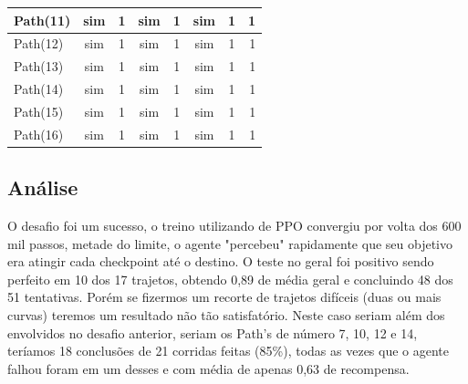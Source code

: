 \begin{table}[htpb]
\begin{tabular}{|l|c|c|c|c|c|c|r|}
            Path(11)  &      sim        &   1             &    sim          &      1        &    sim          &      1     &      1                 \\ \hline
            Path(12)  &      sim        &   1             &    sim          &      1        &    sim          &      1     &      1                 \\ \hline
            Path(13)  &      sim        &   1             &    sim          &      1        &    sim          &      1     &      1                 \\ \hline
            Path(14)  &      sim        &   1             &    sim          &      1        &    sim          &      1     &      1                 \\ \hline
            Path(15)  &      sim        &   1             &    sim          &      1        &    sim          &      1     &      1                 \\ \hline
            Path(16)  &      sim        &   1             &    sim          &      1        &    sim          &      1     &      1                 \\ \hline
    \end{tabular}
\end{table}
\subsection*{Análise}
O desafio foi um sucesso, o treino utilizando de PPO convergiu por volta dos 600 mil passos, metade do limite, o agente "percebeu" rapidamente que seu objetivo era atingir cada checkpoint até o destino. O teste no geral foi positivo sendo perfeito em 10 dos 17 trajetos, obtendo 0,89 de média geral e concluindo 48 dos 51 tentativas. 
Porém se fizermos um recorte de trajetos difíceis (duas ou mais curvas) teremos um resultado não tão satisfatório. Neste caso seriam além dos envolvidos no desafio anterior, seriam os Path's de número 7, 10, 12 e 14, teríamos 18 conclusões de 21 corridas feitas (85\%), todas as vezes que o agente falhou foram em um desses e com média de apenas 0,63 de recompensa.